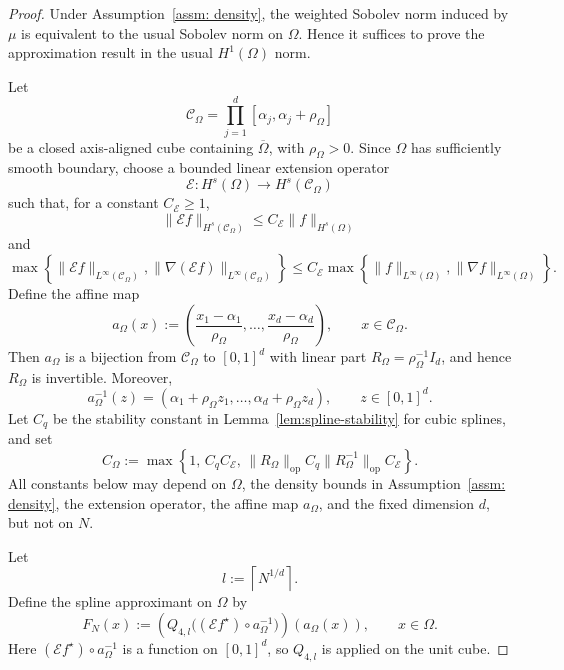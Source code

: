 \documentclass[11pt]{article}
\theoremstyle{plain}
\theoremstyle{definition}
\theoremstyle{remark}
\begin{document}
\begin{proof}
Under Assumption~\ref{assm: density}, the weighted Sobolev norm induced by
\(\mu\) is equivalent to the usual Sobolev norm on \(\Omega\). Hence it
suffices to prove the approximation result in the usual \(H^1(\Omega)\) norm.

Let
\[
\mathcal C_\Omega
=
\prod_{j=1}^d[\alpha_j,\alpha_j+\rho_\Omega]
\]
be a closed axis-aligned cube containing \(\overline\Omega\), with
\(\rho_\Omega>0\). Since \(\Omega\) has sufficiently smooth boundary, choose a
bounded linear extension operator
\[
\mathcal E:H^s(\Omega)\to H^s(\mathcal C_\Omega)
\]
such that, for a constant \(C_{\mathcal E}\ge1\),
\[
\|\mathcal E f\|_{H^s(\mathcal C_\Omega)}
\le
C_{\mathcal E}\|f\|_{H^s(\Omega)}
\]
and
\[
\max\left\{
\|\mathcal E f\|_{L^\infty(\mathcal C_\Omega)},
\|\nabla(\mathcal E f)\|_{L^\infty(\mathcal C_\Omega)}
\right\}
\le
C_{\mathcal E}
\max\left\{
\|f\|_{L^\infty(\Omega)},
\|\nabla f\|_{L^\infty(\Omega)}
\right\}.
\]
Define the affine map
\[
a_\Omega(x)
:=
\left(
\frac{x_1-\alpha_1}{\rho_\Omega},
\ldots,
\frac{x_d-\alpha_d}{\rho_\Omega}
\right),
\qquad x\in \mathcal C_\Omega .
\]
Then \(a_\Omega\) is a bijection from \(\mathcal C_\Omega\) to \([0,1]^d\)
with linear part \(R_\Omega=\rho_\Omega^{-1}I_d\), and hence \(R_\Omega\) is
invertible. Moreover,
\[
a_\Omega^{-1}(z)
=
(\alpha_1+\rho_\Omega z_1,\ldots,\alpha_d+\rho_\Omega z_d),
\qquad z\in[0,1]^d .
\]
Let \(C_q\) be the stability constant in
Lemma~\ref{lem:spline-stability} for cubic splines, and set
\[
C_\Omega
:=
\max\left\{
1,\,
C_qC_{\mathcal E},\,
\|R_\Omega\|_{\mathrm{op}}C_q
\|R_\Omega^{-1}\|_{\mathrm{op}}C_{\mathcal E}
\right\}.
\]
All constants below may depend on \(\Omega\), the density bounds in
Assumption~\ref{assm: density}, the extension operator, the affine map
\(a_\Omega\), and the fixed dimension \(d\), but not on \(N\).

Let
\[
l:=\left\lceil N^{1/d}\right\rceil .
\]
Define the spline approximant on \(\Omega\) by
\begin{equation}\label{eq:def of F_N}
    F_N(x)
:=
\left(
Q_{4,l}\bigl((\mathcal E f^\star)\circ a_\Omega^{-1}\bigr)
\right)(a_\Omega(x)),
\qquad x\in\Omega .
\end{equation}
Here \((\mathcal E f^\star)\circ a_\Omega^{-1}\) is a function on
\([0,1]^d\), so \(Q_{4,l}\) is applied on the unit cube.


\end{proof}
\end{document}
